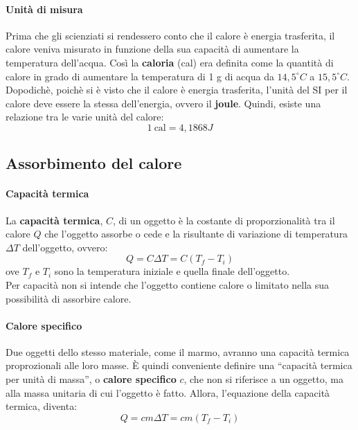 \documentclass[12pt]{report}
\begin{document}
	\paragraph{Unità di misura} Prima che gli scienziati si rendessero conto che il calore è energia trasferita, il calore veniva misurato in funzione della sua capacità di aumentare la temperatura dell'acqua. Così la \textbf{caloria} (cal) era definita come la quantità di calore in grado di aumentare la temperatura di 1 g di acqua da $14,5 ^\circ C$ a $15,5 ^\circ C$. Dopodichè, poichè si è visto che il calore è energia trasferita, l'unità del SI per il calore deve essere la stessa dell'energia, ovvero il \textbf{joule}. Quindi, esiste una relazione tra le varie unità del calore:
	\[
	1\ \text{cal} = 4,1868 J
	\]
	\subsection{Assorbimento del calore}
	\paragraph{Capacità termica}
	La \textbf{capacità termica}, $C$, di un oggetto è la costante di proporzionalità tra il calore $Q$ che l'oggetto assorbe o cede e la risultante di variazione di temperatura $\Delta T$ dell'oggetto, ovvero:
	\[
	Q = C\Delta T = C(T_f - T_i)
	\]
	ove $T_f$ e $T_i$ sono la temperatura iniziale e quella finale dell'oggetto. \\
	Per capacità non si intende che l'oggetto contiene calore o limitato nella sua possibilità di assorbire calore.
	\paragraph{Calore specifico}
	Due oggetti dello stesso materiale, come il marmo, avranno una capacità termica proprozionali alle loro masse. È quindi conveniente definire una ``capacità termica per unità di massa'', o \textbf{calore specifico} $c$, che non si riferisce a un oggetto, ma alla massa unitaria di cui l'oggetto è fatto. Allora, l'equazione della capacità termica, diventa:
	\[
	Q = cm\Delta T = cm(T_f - T_i)
	\]
\end{document}
